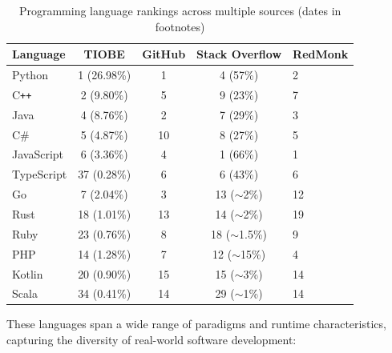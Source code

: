\documentclass{article} %
\begin{document}
\begin{table}[hbp]
\centering
\caption{Programming language rankings across multiple sources (dates in footnotes)}
\label{tab:lang-2025-en}
\begin{tabular}{lcccl}
\toprule
\textbf{Language} & \textbf{TIOBE\footnotemark[1]} & \textbf{GitHub\footnotemark[2]} & \textbf{Stack Overflow\footnotemark[3]} & \textbf{RedMonk\footnotemark[4]} \\
\midrule
Python      & 1 (26.98\%) & 1       & 4 (57\%)         & 2  \\
C\texttt{++} & 2 (9.80\%)  & 5  & 9 (23\%)         & 7  \\
Java        & 4 (8.76\%)  & 2       & 7 (29\%)         & 3  \\
C\#         & 5 (4.87\%)  & 10  & 8 (27\%)         & 5  \\
JavaScript  & 6 (3.36\%)  & 4       & 1 (66\%)         & 1  \\
TypeScript  & 37 (0.28\%) & 6       & 6 (43\%)         & 6  \\
Go          & 7 (2.04\%)  & 3  & 13 ($\sim$2\%) & 12 \\
Rust        & 18 (1.01\%) & 13 & 14 ($\sim$2\%) & 19 \\
Ruby        & 23 (0.76\%) & 8  & 18 ($\sim$1.5\%) & 9 \\
PHP         & 14 (1.28\%) & 7  & 12 ($\sim$15\%)  & 4 \\
Kotlin      & 20 (0.90\%) & 15  & 15 ($\sim$3\%)   & 14 \\
Scala       & 34 (0.41\%) & 14   & 29 ($\sim$1\%)   & 14 \\
\bottomrule
\end{tabular}
\end{table}

These languages span a wide range of paradigms and runtime characteristics, capturing the diversity of real-world software development:
\end{document}
